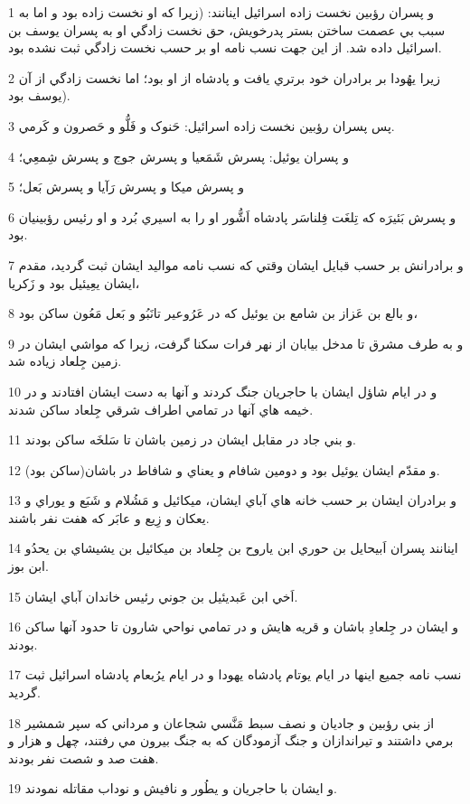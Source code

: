 \par 1 و پسران رؤبين نخست زاده اسرائيل اينانند: (زيرا که او نخست زاده بود و اما به سبب بي عصمت ساختن بستر پدرخويش، حق نخست زادگي او به پسران يوسف بن اسرائيل داده شد. از اين جهت نسب نامه او بر حسب نخست زادگي ثبت نشده بود.
\par 2 زيرا يهُودا بر برادران خود برتري يافت و پادشاه از او بود؛ اما نخست زادگي از آن يوسف بود).
\par 3 پس پسران رؤبين نخست زاده اسرائيل: حَنوک و فَلُّو و حَصرون و کَرمي.
\par 4 و پسران يوئيل: پسرش شَمَعيا و پسرش جوج و پسرش شِمعِي؛
\par 5 و پسرش ميکا و پسرش رَآيا و پسرش بَعل؛
\par 6 و پسرش بَئيرَه که تِلغَت فِلناسَر پادشاه اَشُّور او را به اسيري بُرد و او رئيس رؤبينيان بود.
\par 7 و برادرانش بر حسب قبايل ايشان وقتي که نسب نامه مواليد ايشان ثبت گرديد، مقدم ايشان يعِيئيل بود و زَکريا،
\par 8 و بالع بن عَزاز بن شامع بن يوئيل که در عَرُوعير تانَبُو و بَعل مَعُون ساکن بود،
\par 9 و به طرف مشرق تا مدخل بيابان از نهر فرات سکنا گرفت، زيرا که مواشي ايشان در زمين جِلعاد زياده شد.
\par 10 و در ايام شاؤل ايشان با حاجريان جنگ کردند و آنها به دست ايشان افتادند و در خيمه هاي آنها در تمامي اطراف شرقي جِلعاد ساکن شدند.
\par 11 و بني جاد در مقابل ايشان در زمين باشان تا سَلخَه ساکن بودند.
\par 12 و مقدّم ايشان يوئيل بود و دومين شافام و يعناي و شافاط در باشان(ساکن بود).
\par 13 و برادران ايشان بر حسب خانه هاي آباي ايشان، ميکائيل و مَشُلام و شَبَع و يوراي و يعکان و زِيع و عابَر که هفت نفر باشند.
\par 14 اينانند پسران اَبيحايل بن حوري ابن ياروح بن جِلعاد بن ميکائيل بن يشيشاي بن يحدُو ابن بوز.
\par 15 اَخي ابن عَبديئيل بن جوني رئيس خاندان آباي ايشان.
\par 16 و ايشان در جِلعادِ باشان و قريه هايش و در تمامي نواحي شارون تا حدود آنها ساکن بودند.
\par 17 نسب نامه جميع اينها در ايام يوتام پادشاه يهودا و در ايام يرُبعام پادشاه اسرائيل ثبت گرديد.
\par 18 از بني رؤبين و جاديان و نصف سبط مَنَّسي شجاعان و مرداني که سپر شمشير برمي داشتند و تيراندازان و جنگ آزمودگان که به جنگ بيرون مي رفتند، چهل و هزار و هفت صد و شصت نفر بودند.
\par 19 و ايشان با حاجريان و يطُور و نافيش و نوداب مقاتله نمودند.
